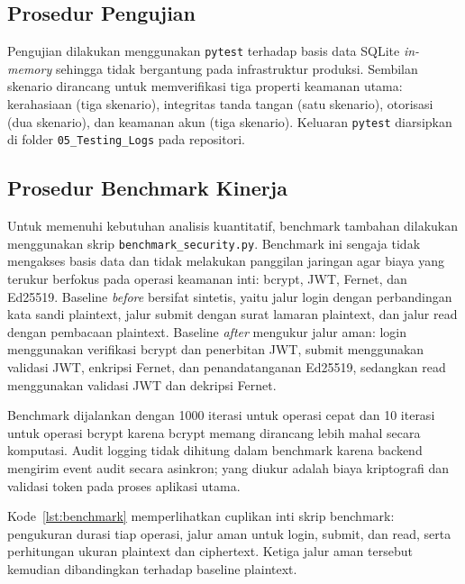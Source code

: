 \documentclass[12pt,a4paper]{article}
\begin{document}
\subsection{Prosedur Pengujian}

Pengujian dilakukan menggunakan \texttt{pytest} terhadap basis data
SQLite \textit{in-memory} sehingga tidak bergantung pada infrastruktur
produksi. Sembilan skenario dirancang untuk memverifikasi tiga properti
keamanan utama: kerahasiaan (tiga skenario), integritas tanda tangan
(satu skenario), otorisasi (dua skenario), dan keamanan akun (tiga
skenario). Keluaran \texttt{pytest} diarsipkan di folder
\texttt{05\_Testing\_Logs} pada repositori.

\subsection{Prosedur Benchmark Kinerja}

Untuk memenuhi kebutuhan analisis kuantitatif, benchmark tambahan
dilakukan menggunakan skrip \texttt{benchmark\_security.py}. Benchmark
ini sengaja tidak mengakses basis data dan tidak melakukan panggilan
jaringan agar biaya yang terukur berfokus pada operasi keamanan inti:
bcrypt, JWT, Fernet, dan Ed25519. Baseline \textit{before} bersifat
sintetis, yaitu jalur login dengan perbandingan kata sandi plaintext,
jalur submit dengan surat lamaran plaintext, dan jalur read dengan
pembacaan plaintext. Baseline \textit{after} mengukur jalur aman:
login menggunakan verifikasi bcrypt dan penerbitan JWT, submit
menggunakan validasi JWT, enkripsi Fernet, dan penandatanganan
Ed25519, sedangkan read menggunakan validasi JWT dan dekripsi Fernet.

Benchmark dijalankan dengan 1000 iterasi untuk operasi cepat dan 10
iterasi untuk operasi bcrypt karena bcrypt memang dirancang lebih mahal
secara komputasi. Audit logging tidak dihitung dalam benchmark karena
backend mengirim event audit secara asinkron; yang diukur adalah biaya
kriptografi dan validasi token pada proses aplikasi utama.

Kode~\ref{lst:benchmark} memperlihatkan cuplikan inti skrip benchmark:
pengukuran durasi tiap operasi, jalur aman untuk login, submit, dan
read, serta perhitungan ukuran plaintext dan ciphertext. Ketiga jalur
aman tersebut kemudian dibandingkan terhadap baseline plaintext.
\end{document}
